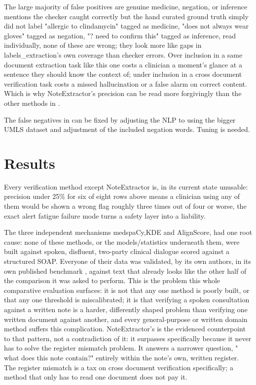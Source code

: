 \documentclass[11pt,a4paper]{article}
\begin{document}
The large
majority of false positives are genuine medicine, negation, or inference mentions the checker caught
correctly but the hand curated ground truth simply did not label "allergic to
clindamycin" tagged as medicine, "does not always wear gloves" tagged as negation,
"? need to confirm this" tagged as inference,  read individually, none of these are
wrong; they look more like gaps in labels\_extraction's own coverage than checker
errors. Over inclusion in a same document extraction task like this one costs a
clinician a moment's glance at a sentence they should know the context of; under inclusion in a
cross document verification task costs a missed hallucination or a false alarm on
correct content. Which is why NoteExtractor's precision can
be read more forgivingly than the other methods in .

The false negatives in  can be fixed by adjusting the NLP to using the bigger UMLS dataset and adjustment of the included negation words. Tuning is needed.


\section{Results}
\label{sec:Results}

\begin{table}[htbp]
  \centering
  
  \caption{Results of all the modules}
   \label{tab:results}
\end{table}

Every verification method except NoteExtractor is, in its current state unusable: precision under 25\% for six of eight rows above means a clinician using any of them would be shown a wrong flag roughly three times out of four or worse, the exact alert fatigue failure mode turns a safety layer into a liability. 

The three independent mechanisms medspaCy,KDE and AlignScore, had one root cause: none of these methods, or the models/statistics underneath them, were built against spoken, disfluent, two-party clinical dialogue scored against a structured SOAP. Everyone of their data was validated, by its own authors, in its own published benchmark , against text that already looks like the other half of the comparison it was asked to perform. 
This is the problem this whole comparative evaluation surfaces: it is not that any one method is poorly built, or that any one threshold is miscalibrated; it is that verifying a spoken consultation against a written note is a harder, differently shaped problem than verifying one written document against another, and every general-purpose or written domain method suffers this complication. 
NoteExtractor’s  is the evidenced counterpoint to that pattern, not a contradiction of it: it surpasses specifically because it never has to solve the register mismatch problem. It answers a narrower question, " what does this note contain?"  entirely within the note’s own, written register. The register mismatch is a tax on cross document verification specifically; a method that only has to read one document does not pay it.
\end{document}
